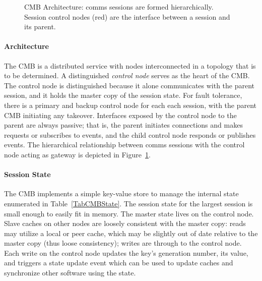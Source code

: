 \begin{figure}
\begin{minipage}[b]{0.2\linewidth}
\end{minipage}
\caption{CMB Architecture:  comms sessions are formed hierarchically.
Session control nodes (red) are the interface between a session and its parent.}
\label{FigCommsEx1}
\end{figure}

\paragraph{Architecture}
The CMB is a distributed service with nodes interconnected in a topology
that is to be determined.
A distinguished {\em control node} serves as the heart of the CMB.
The control node is distinguished because it alone communicates with
the parent session, and it holds the master copy of the session state.
For fault tolerance, there is a primary and backup control node for each
each session, with the parent CMB initiating any takeover.
Interfaces exposed by the control node to the parent are always passive;
that is, the parent initiates connections and makes requests or subscribes
to events, and the child control node responds or publishes events.
The hierarchical relationship between comms sessions with the control
node acting as gateway is depicted in Figure~\ref{FigCommsEx1}.

\paragraph{Session State}
The CMB implements a simple key-value store to manage the
internal state enumerated in Table~\ref{TabCMBState}.
The session state for the largest session is small enough to easily
fit in memory.
The master state lives on the control node.
Slave caches on other nodes are loosely consistent with the master copy:
reads may utilize a local or peer cache, which may be slightly out of date
relative to the master copy (thus loose consistency);
writes are through to the control node.
Each write on the control node updates the key's generation number,
its value, and triggers a state update event which
can be used to update caches and synchronize other software using the
state.

